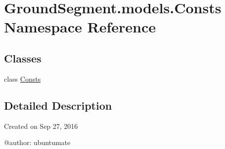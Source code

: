 \hypertarget{namespace_ground_segment_1_1models_1_1_consts}{}\section{Ground\+Segment.\+models.\+Consts Namespace Reference}
\label{namespace_ground_segment_1_1models_1_1_consts}
\subsection*{Classes}
\begin{DoxyCompactItemize}
\item 
class \hyperlink{class_ground_segment_1_1models_1_1_consts_1_1_consts}{Consts}
\end{DoxyCompactItemize}


\subsection{Detailed Description}
\begin{DoxyVerb}Created on Sep 27, 2016

@author: ubuntumate
\end{DoxyVerb}
 